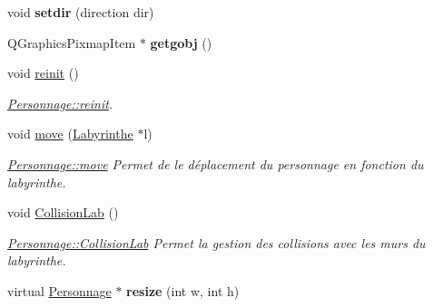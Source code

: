 \begin{DoxyCompactItemize}
\item 
\hypertarget{class_personnage_a4f68109b5502cf8dd451cfde07ea0f80}{}void {\bfseries setdir} (direction dir)\label{class_personnage_a4f68109b5502cf8dd451cfde07ea0f80}

\item 
\hypertarget{class_personnage_aa0e21a766208ea65c9929a8121e18dbe}{}Q\+Graphics\+Pixmap\+Item $\ast$ {\bfseries getgobj} ()\label{class_personnage_aa0e21a766208ea65c9929a8121e18dbe}

\item 
\hypertarget{class_personnage_a99c5442355ae6ebd56f34055a114ba69}{}void \hyperlink{class_personnage_a99c5442355ae6ebd56f34055a114ba69}{reinit} ()\label{class_personnage_a99c5442355ae6ebd56f34055a114ba69}

\begin{DoxyCompactList}\small\item\em \hyperlink{class_personnage_a99c5442355ae6ebd56f34055a114ba69}{Personnage\+::reinit}. \end{DoxyCompactList}\item 
void \hyperlink{class_personnage_a6ae5430d11fd2f01a4219722d860929f}{move} (\hyperlink{class_labyrinthe}{Labyrinthe} $\ast$l)
\begin{DoxyCompactList}\small\item\em \hyperlink{class_personnage_a6ae5430d11fd2f01a4219722d860929f}{Personnage\+::move} Permet de le déplacement du personnage en fonction du labyrinthe. \end{DoxyCompactList}\item 
\hypertarget{class_personnage_a5791bfb8523c996039f4376c7daf4881}{}void \hyperlink{class_personnage_a5791bfb8523c996039f4376c7daf4881}{Collision\+Lab} ()\label{class_personnage_a5791bfb8523c996039f4376c7daf4881}

\begin{DoxyCompactList}\small\item\em \hyperlink{class_personnage_a5791bfb8523c996039f4376c7daf4881}{Personnage\+::\+Collision\+Lab} Permet la gestion des collisions avec les murs du labyrinthe. \end{DoxyCompactList}\item 
\hypertarget{class_personnage_a97bb68a40dc43e1c4a0ac920fb24e4ad}{}virtual \hyperlink{class_personnage}{Personnage} $\ast$ {\bfseries resize} (int w, int h)\label{class_personnage_a97bb68a40dc43e1c4a0ac920fb24e4ad}

\end{DoxyCompactItemize}
